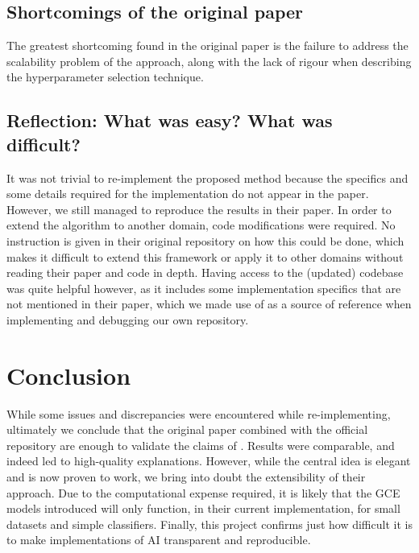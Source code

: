 \subsection{Shortcomings of the original paper}

The greatest shortcoming found in the original paper is the failure to address the scalability problem of the approach, along with the lack of rigour when describing the hyperparameter selection technique. 

\subsection{Reflection: What was easy? What was difficult?}

It was not trivial to re-implement the proposed method because the specifics and some details required for the implementation do not appear in the paper. However, we still managed to reproduce the results in their paper. In order to extend the algorithm to another domain, code modifications were required. No instruction is given in their original repository on how this could be done, which makes it difficult to extend this framework or apply it to other domains without reading their paper and code in depth. Having access to the (updated) codebase was quite helpful however, as it includes some implementation specifics that are not mentioned in their paper, which we made use of as a source of reference when implementing and debugging our own repository.

\section{Conclusion}

While some issues and discrepancies were encountered while re-implementing, ultimately we conclude that the original paper combined with the official repository are enough to validate the claims of \cite{oshaughnessy2020generative}. Results were comparable, and indeed led to high-quality explanations. However, while the  central idea is elegant and is now proven to work, we bring into doubt the extensibility of their approach. Due to the computational expense required, it is likely that the GCE models introduced will only function, in their current implementation, for small datasets and simple classifiers. Finally, this project confirms just how difficult it is to make implementations of AI transparent and reproducible.
